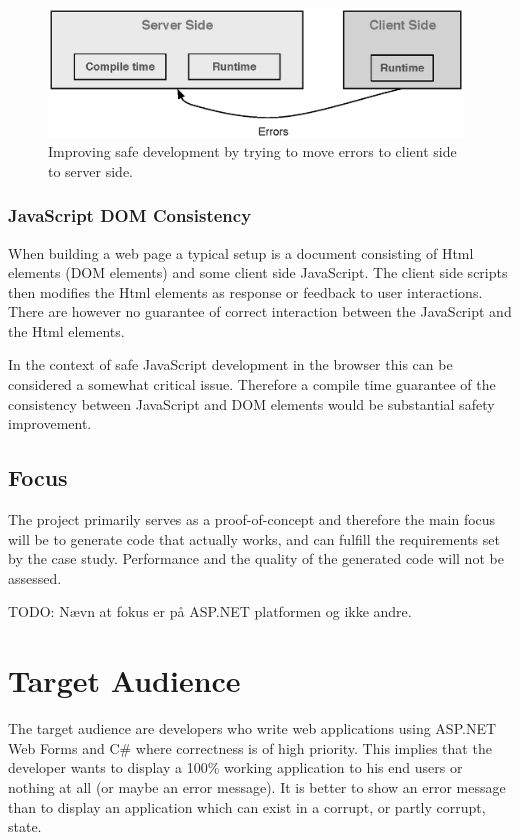 			\begin{figure}
				\begin{center}
					\centerline{\includegraphics[width=11cm]{resources/images/MovingErrors.eps}}
				\end{center}
				\caption{Improving safe development by trying to move errors to client side to server side.}
				\label{movingErrors}
			\end{figure}

		\subsubsection{JavaScript DOM Consistency} %
		\label{ssub:javascript_dom_consistency}
			When building a web page a typical setup is a document consisting of Html elements (DOM elements) and some client side JavaScript. The client side scripts then modifies the Html elements as response or feedback to user interactions. There are however no guarantee of correct interaction between the JavaScript and the Html elements.

			In the context of safe JavaScript development in the browser this can be considered a somewhat critical issue. Therefore a compile time guarantee of the consistency between JavaScript and DOM elements would be substantial safety improvement.




	\subsection{Focus}
		The project primarily serves as a proof-of-concept and therefore the main focus will be to generate code that actually works, and can fulfill the requirements set by the case study. Performance and the quality of the generated code will not be assessed. 

		TODO: Nævn at fokus er på ASP.NET platformen og ikke andre.

\section{Target Audience}
	The target audience are developers who write web applications using ASP.NET Web Forms and C\# where correctness is of high priority. This implies that the developer wants to display a 100\% working application to his end users or nothing at all (or maybe an error message). It is better to show an error message than to display an application which can exist in a corrupt, or partly corrupt, state.





